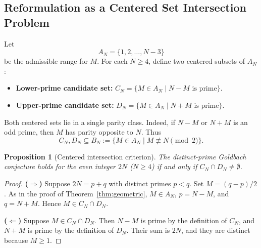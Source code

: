 \documentclass[11pt]{amsart}
\newtheorem{Proposition}[Theorem]{Proposition}
\theoremstyle{definition}
\theoremstyle{remark}
\begin{document}
\subsection{Reformulation as a Centered Set Intersection Problem}\label{subsec:setintersection}
Let
\[
A_N=\{1,2,\ldots,N-3\}
\]
be the admissible range for $M$. For each $N \geq 4$, define two centered subsets of $A_N$:
\begin{itemize}
\item \textbf{Lower-prime candidate set:} $C_N = \{M\in A_N \mid N-M \text{ is prime}\}$.
\item \textbf{Upper-prime candidate set:} $D_N = \{M\in A_N \mid N+M \text{ is prime}\}$.
\end{itemize}
Both centered sets lie in a single parity class. Indeed, if $N-M$ or $N+M$ is an odd prime, then $M$ has parity opposite to $N$. Thus
\[
C_N,D_N\subseteq B_N:=\{M\in A_N\mid M\not\equiv N\pmod 2\}.
\]
\begin{Proposition}[Centered intersection criterion]\label{prop:intersection}
The distinct-prime Goldbach conjecture holds for the even integer $2N$ ($N \geq 4$) if and only if $C_N \cap D_N \neq \emptyset$.
\end{Proposition}
\begin{proof}
\textbf{($\Rightarrow$)} Suppose $2N = p + q$ with distinct primes $p < q$. Set $M = (q-p)/2$. As in the proof of Theorem~\ref{thm:geometric}, $M \in A_N$, $p=N-M$, and $q=N+M$. Hence $M\in C_N\cap D_N$.

\textbf{($\Leftarrow$)} Suppose $M \in C_N \cap D_N$. Then $N-M$ is prime by the definition of $C_N$, and $N+M$ is prime by the definition of $D_N$. Their sum is $2N$, and they are distinct because $M\geq 1$.
\end{proof}
\end{document}
